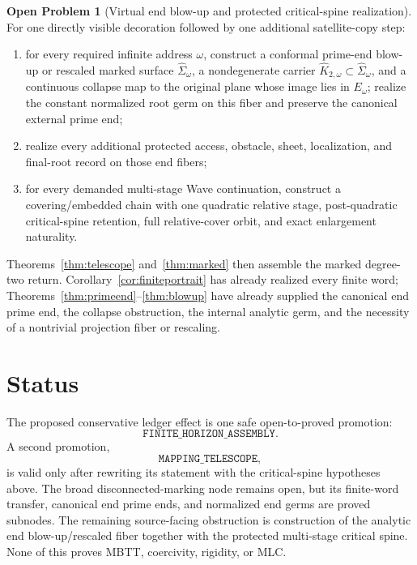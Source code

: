 \documentclass[11pt]{article}
\theoremstyle{definition}
\newtheorem{problem}[theorem]{Open Problem}
\theoremstyle{remark}
\begin{document}
\begin{problem}[Virtual end blow-up and protected critical-spine realization]\label{prob:residual}
For one directly visible decoration followed by one additional satellite-copy step:
\begin{enumerate}[label=(\arabic*)]
\item for every required infinite address $\omega$, construct a conformal prime-end blow-up or rescaled marked surface $\widehat\Sigma_\omega$, a nondegenerate carrier $\widehat K_{2,\omega}\subset\widehat\Sigma_\omega$, and a continuous collapse map to the original plane whose image lies in $E_\omega$; realize the constant normalized root germ on this fiber and preserve the canonical external prime end;
\item realize every additional protected access, obstacle, sheet, localization, and final-root record on those end fibers;
\item for every demanded multi-stage Wave continuation, construct a covering/embedded chain with one quadratic relative stage, post-quadratic critical-spine retention, full relative-cover orbit, and exact enlargement naturality.
\end{enumerate}
Theorems~\ref{thm:telescope} and~\ref{thm:marked} then assemble the marked degree-two return.  Corollary~\ref{cor:finiteportrait} has already realized every finite word; Theorems~\ref{thm:primeend}--\ref{thm:blowup} have already supplied the canonical end prime end, the collapse obstruction, the internal analytic germ, and the necessity of a nontrivial projection fiber or rescaling.
\end{problem}

\section*{Status}
The proposed conservative ledger effect is one safe open-to-proved promotion:
\[
 \texttt{FINITE\_HORIZON\_ASSEMBLY}.
\]
A second promotion,
\[
 \texttt{MAPPING\_TELESCOPE},
\]
is valid only after rewriting its statement with the critical-spine hypotheses above.  The broad disconnected-marking node remains open, but its finite-word transfer, canonical end prime ends, and normalized end germs are proved subnodes.  The remaining source-facing obstruction is construction of the analytic end blow-up/rescaled fiber together with the protected multi-stage critical spine.  None of this proves MBTT, coercivity, rigidity, or MLC.
\end{document}
